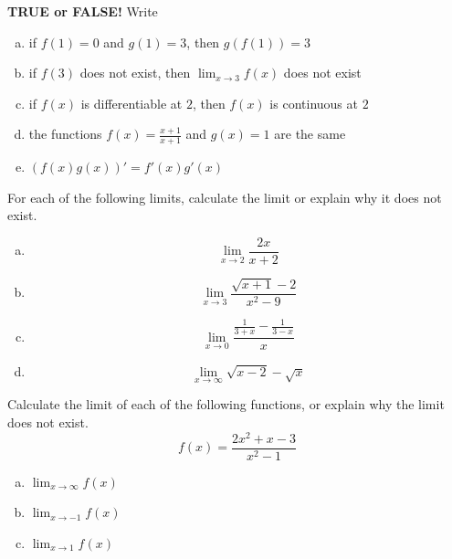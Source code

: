 \documentclass[11pt]{exam}
\theoremstyle{definition}
\begin{document}
\begin{questions}

\addpoints

\question[10]\mbox{}
\textbf{TRUE or FALSE!}  Write 
\begin{enumerate}[(a)]
\item if $f(1) = 0$ and $g(1)=3$, then $g(f(1)) = 3$
\vspace{1.2in}
\item if $f(3)$ does not exist, then $\lim_{x\rightarrow 3} f(x)$ does not exist
\vspace{1.2in}
\item if $f(x)$ is differentiable at $2$, then $f(x)$ is continuous at $2$
\vspace{1.2in}
\item the functions $f(x) = \frac{x+1}{x+1}$ and $g(x) = 1$ are the same
\vspace{1.2in}
\item $(f(x)g(x))' = f'(x)g'(x)$
\vspace{1.2in}
\end{enumerate}

\newpage
\question[12]\mbox{}
For each of the following limits, calculate the limit or explain why it does not exist.
\begin{enumerate}[(a)]
\item $$\lim_{x\rightarrow 2} \frac{2x}{x+2}$$
\vspace{1.5in}
\item $$\lim_{x\rightarrow 3} \frac{\sqrt{x+1}-2}{x^2-9}$$
\vspace{1.5in}
\item $$\lim_{x\rightarrow 0} \frac{\frac{1}{3+x}-\frac{1}{3-x}}{x}$$
\vspace{1.5in}
\item $$\lim_{x\rightarrow\infty}\sqrt{x-2}-\sqrt{x}$$
\end{enumerate}

\newpage
\question[10]\mbox{}
Calculate the limit of each of the following functions, or explain why the limit does not exist.
$$f(x) = \frac{2x^2+x-3}{x^2-1}$$
\begin{enumerate}[(a)]
\item $\lim_{x\rightarrow\infty}f(x)$
\vspace{2in}
\item $\lim_{x\rightarrow -1} f(x)$
\vspace{2in}
\item $\lim_{x\rightarrow  1} f(x)$
\end{enumerate}


\end{questions}
\end{document}
